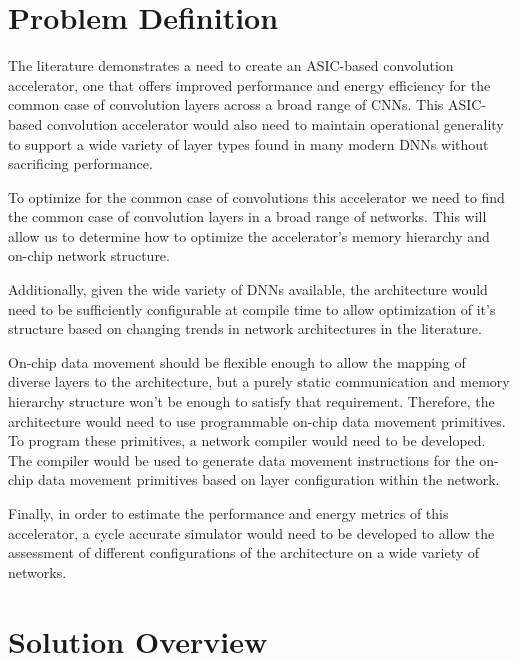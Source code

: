 \section{Problem Definition}
\label{chap:intro:prob_def}

The literature demonstrates a need to create an ASIC-based convolution
accelerator, one that offers improved performance and energy efficiency for the
common case of convolution layers across a broad range of \ac{CNN}s. This
ASIC-based convolution accelerator would also need to maintain operational generality
to support a wide variety of layer types found in many modern DNNs without sacrificing
performance. 

To optimize for the common case of convolutions this accelerator we need to find the
common case of convolution layers in a broad range of networks. This will allow
us to determine how to optimize the accelerator's memory hierarchy and on-chip
network structure.   

Additionally, given the wide variety of DNNs available, the
architecture would need to be sufficiently configurable at compile time to allow
optimization of it's structure based on changing trends in network
architectures in the literature. 

On-chip data movement should be flexible enough to allow the mapping of
diverse layers to the architecture, but a purely static communication and memory
hierarchy structure won't be enough to satisfy that requirement. Therefore, the
architecture would need to use programmable on-chip data movement primitives. To
program these primitives, a network compiler would need to be developed. The
compiler would be used to generate data movement instructions for the on-chip
data movement primitives based on layer configuration within the network.   

Finally, in order to estimate the performance and energy metrics of this accelerator, a
cycle accurate simulator would need to be developed to allow the assessment of
different configurations of the architecture on a wide variety of networks. 

\section{Solution Overview}
\label{chap:intro:solution_overview}

